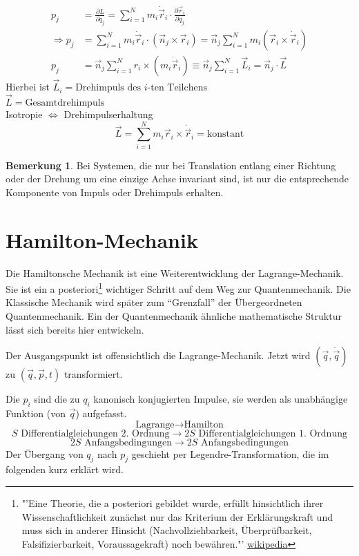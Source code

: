 \documentclass[oneside]{book}
\theoremstyle{definition}
\newtheorem*{bemerkung*}{Bemerkung}
\newcommand{\dotvec}[1]{\dot{\vec{#1}}}
\newcommand{\const}{\text{konstant}}
\begin{document}
\begin{align*}
	p_j &= \frac{\partial L}{\partial \dot q_j} = \sum\limits_{i=1}^Nm_i \dot {\vec r}_i \cdot \frac{\partial \vec r_i}{\partial q_j}\\
	\Rightarrow p_j &= \sum\limits_{i=1}^N m_i \dot {\vec r}_i \cdot (\vec n_j \times \vec r_i) = \vec n_j \sum\limits_{i=1}^N m_i (\vec r_i \times \dot {\vec r}_i)\\
	p_j &= \vec n_j \sum\limits_{i=1}^N r_i \times (m_i\dot{\vec r}_i) \equiv \vec n_j \sum\limits_{i=1}^N \vec L_i = \vec n_j \cdot \vec L
\end{align*}
Hierbei ist
$\vec L_i = \text{Drehimpuls des $i$-ten Teilchens}$\\
$\vec L = \text{Gesamtdrehimpuls}$\\
Isotropie  $\Leftrightarrow$ Drehimpulserhaltung
\[\vec L = \sum\limits_{i=1}^Nm_i \vec r_i \times \dotvec r_i = \const \]
\begin{bemerkung*}
	Bei Systemen, die nur bei Translation entlang einer Richtung oder der Drehung um eine einzige Achse invariant sind, ist nur die entsprechende Komponente von Impuls oder Drehimpuls erhalten.
\end{bemerkung*}

\section{Hamilton-Mechanik}
Die Hamiltonsche Mechanik ist eine Weiterentwicklung der Lagrange-Mechanik. Sie ist ein a posteriori\footnote{"'Eine Theorie, die a posteriori gebildet wurde, erfüllt hinsichtlich ihrer Wissenschaftlichkeit zunächst nur das Kriterium der Erklärungskraft und muss sich in anderer Hinsicht (Nachvollziehbarkeit, Überprüfbarkeit, Falsifizierbarkeit, Voraussagekraft) noch bewähren."' \href{https://de.wikipedia.org/wiki/A_posteriori}{wikipedia}} wichtiger Schritt auf dem Weg zur Quantenmechanik. Die Klassische Mechanik wird später zum "`Grenzfall"' der Übergeordneten Quantenmechanik. Ein der Quantenmechanik ähnliche mathematische Struktur lässt sich bereits hier entwickeln.

Der Ausgangspunkt ist offensichtlich die Lagrange-Mechanik. Jetzt wird $(\vec q, \dot {\vec q})$ zu $(\vec q, \vec p, t)$ transformiert.

Die $p_i$ sind die zu $q_i$ kanonisch konjugierten Impulse, sie werden als unabhängige Funktion (von $\vec q$) aufgefasst.
\[\text{Lagrange}\to\text{Hamilton}\]
\[\text{$S$ Differentialgleichungen 2. Ordnung}\to\text{$2S$ Differentialgleichungen 1. Ordnung}\]
\[\text{$2S$ Anfangsbedingungen}\to\text{$2S$ Anfangsbedingungen}\]
Der Übergang von $q_j$ nach $p_j$ geschieht per Legendre-Transformation, die im folgenden kurz erklärt wird.
\end{document}
